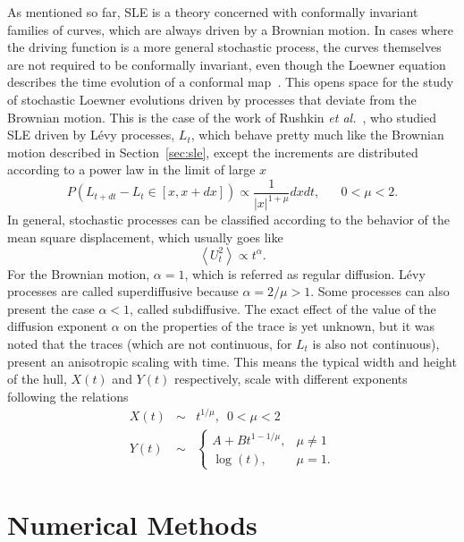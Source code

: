 As mentioned so far, SLE is a theory concerned with conformally invariant
families of curves, which are always driven by a Brownian motion. In cases
where the driving function is a more general stochastic process, the
curves themselves are not required to be conformally invariant, even though the
Loewner equation describes the time evolution of a conformal
map~\cite{Henkel2012}. This opens space for the study of stochastic Loewner
evolutions driven by processes that deviate from the Brownian motion. This is
the case of the work of Rushkin \textit{et al.}~\cite{Rushkin2006,
Oikonomou2008}, who studied SLE driven by L\'evy processes, $L_t$, which
behave pretty much like the Brownian motion described in Section~\ref{sec:sle},
except the increments are distributed according to a
power law in the limit of large $x$
\begin{equation}
    P(L_{t+dt} - L_t \in [x, x+dx]) \propto \frac{1}{|x|^{1+\mu}}dxdt,
    \,\,\,\,\,\,\,\,\,\,
    0<\mu<2.
\end{equation}
In general, stochastic processes can be classified according 
to the behavior of the mean square displacement, which usually goes like
\begin{equation}
    \left\langle U_{t}^{2}\right\rangle \propto t^{\alpha}.
\end{equation}
For the Brownian motion, $\alpha=1$, which is referred as regular diffusion.
L\'evy processes are called superdiffusive because $\alpha=2/\mu>1$. Some
processes can also present the case $\alpha<1$, called subdiffusive. The exact
effect of the value of the diffusion exponent $\alpha$ on the properties of the
trace is yet unknown, but it was noted that the traces (which are not
continuous, for $L_t$ is also not continuous), present an anisotropic scaling
with time. This means the typical width and height of the hull, $X(t)$ and $Y(t)$
respectively, scale with different exponents following the relations
\begin{eqnarray}
    \label{eq:aniscale}
    X\left(t\right) & \sim & t^{1/\mu},\,\,\,0<\mu<2\\
    Y\left(t\right) & \sim & \begin{cases}
    A+Bt^{1-1/\mu}, & \mu\neq1\\
    \log\left(t\right), & \mu=1.
    \end{cases}
\end{eqnarray}


\section{Numerical Methods}
\label{sec:num}

